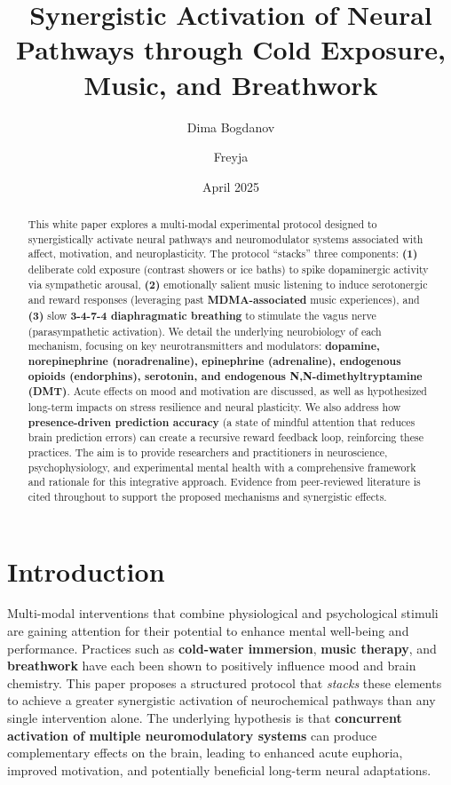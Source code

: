 \documentclass[11pt]{article}
\title{\textbf{Synergistic Activation of Neural Pathways through Cold Exposure, Music, and Breathwork}}
\author{Dima Bogdanov}
\author{Freyja}
\affil[1]{Neural Interface Cognition Lab}
\date{April 2025}
\newcommand{\quotes}[1]{``#1''}
\begin{document}
\maketitle

\begin{abstract}
This white paper explores a multi-modal experimental protocol designed to synergistically activate neural pathways and neuromodulator systems associated with affect, motivation, and neuroplasticity. The protocol \quotes{stacks} three components: \textbf{(1)} deliberate cold exposure (contrast showers or ice baths) to spike dopaminergic activity via sympathetic arousal, \textbf{(2)} emotionally salient music listening to induce serotonergic and reward responses (leveraging past \textbf{MDMA-associated} music experiences), and \textbf{(3)} slow \textbf{3-4-7-4 diaphragmatic breathing} to stimulate the vagus nerve (parasympathetic activation). We detail the underlying neurobiology of each mechanism, focusing on key neurotransmitters and modulators: \textbf{dopamine, norepinephrine (noradrenaline), epinephrine (adrenaline), endogenous opioids (endorphins), serotonin, and endogenous N,N-dimethyltryptamine (DMT)}. Acute effects on mood and motivation are discussed, as well as hypothesized long-term impacts on stress resilience and neural plasticity. We also address how \textbf{presence-driven prediction accuracy} (a state of mindful attention that reduces brain prediction errors) can create a recursive reward feedback loop, reinforcing these practices. The aim is to provide researchers and practitioners in neuroscience, psychophysiology, and experimental mental health with a comprehensive framework and rationale for this integrative approach. Evidence from peer-reviewed literature is cited throughout to support the proposed mechanisms and synergistic effects.
\end{abstract}

\section{Introduction}
Multi-modal interventions that combine physiological and psychological stimuli are gaining attention for their potential to enhance mental well-being and performance. Practices such as \textbf{cold-water immersion}, \textbf{music therapy}, and \textbf{breathwork} have each been shown to positively influence mood and brain chemistry. This paper proposes a structured protocol that \textit{stacks} these elements to achieve a greater synergistic activation of neurochemical pathways than any single intervention alone. The underlying hypothesis is that \textbf{concurrent activation of multiple neuromodulatory systems} can produce complementary effects on the brain, leading to enhanced acute euphoria, improved motivation, and potentially beneficial long-term neural adaptations.
\end{document}
